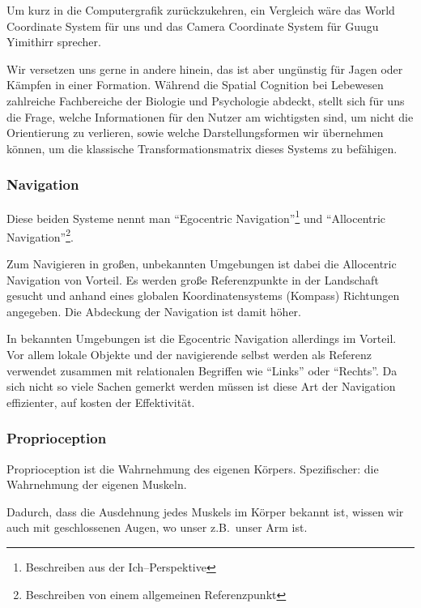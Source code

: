     Um kurz in die Computergrafik zurückzukehren, ein Vergleich wäre das World Coordinate System für uns und das Camera Coordinate System für Guugu Yimithirr sprecher.

    Wir versetzen uns gerne in andere hinein, das ist aber ungünstig für Jagen oder Kämpfen in einer Formation.
    Während die Spatial Cognition bei Lebewesen zahlreiche Fachbereiche der Biologie und Psychologie abdeckt, stellt sich für uns die Frage, welche Informationen für den Nutzer am wichtigsten sind, um nicht die Orientierung zu verlieren, sowie welche Darstellungsformen wir übernehmen können, um die klassische Transformationsmatrix dieses Systems zu befähigen.

    \subsubsection{Navigation}\label{subsubsec:navigation}
        Diese beiden Systeme nennt man \enquote{Egocentric Navigation}\footnote{Beschreiben aus der Ich--Perspektive} und \enquote{Allocentric Navigation}\footnote{Beschreiben von einem allgemeinen Referenzpunkt}. \autocite{wikipedia-contributors-2023F}

        Zum Navigieren in großen, unbekannten Umgebungen ist dabei die Allocentric Navigation von Vorteil.
        Es werden große Referenzpunkte in der Landschaft gesucht und anhand eines globalen Koordinatensystems (Kompass) Richtungen angegeben.
        Die Abdeckung der Navigation ist damit höher.

        In bekannten Umgebungen ist die Egocentric Navigation allerdings im Vorteil.
        Vor allem lokale Objekte und der navigierende selbst werden als Referenz verwendet zusammen mit relationalen Begriffen wie \enquote{Links} oder \enquote{Rechts}.
        Da sich nicht so viele Sachen gemerkt werden müssen ist diese Art der Navigation effizienter, auf kosten der Effektivität.

    \subsubsection{Proprioception}\label{subsubsec:proprioception}
        Proprioception ist die Wahrnehmung des eigenen Körpers. \autocite{wikipedia-contributors-2023H}
        Spezifischer: die Wahrnehmung der eigenen Muskeln.

        Dadurch, dass die Ausdehnung jedes Muskels im Körper bekannt ist, wissen wir auch mit geschlossenen Augen, wo unser z.B.\ unser Arm ist.


